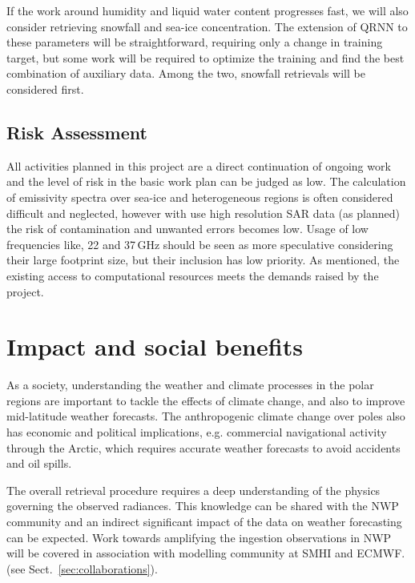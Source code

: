 \documentclass[12pt,oneside,a4paper]{article}
\begin{document}
If the work around humidity and liquid water content progresses fast, we will also consider retrieving snowfall and sea-ice concentration. The extension of QRNN to these parameters will be straightforward, requiring only a change in training target, but some work will be required to optimize the training and find the best combination of auxiliary data. Among the two, snowfall retrievals will be considered first. 
%
 
\subsection{Risk Assessment}
%
\label{sec:risk}
All activities planned in this project are a direct continuation of ongoing
work and the level of risk in the basic work plan can be judged as low. The
calculation of emissivity spectra over sea-ice and heterogeneous regions is
often considered difficult and neglected, however with use high resolution SAR
data (as planned) the risk of contamination and unwanted errors becomes low.
Usage of low frequencies like, 22 and 37\,GHz should be seen as more
speculative considering their large footprint size, but their inclusion has
low priority. As mentioned, the existing access to computational resources
meets the demands raised by the project.


\section{Impact and social benefits}
%
\label{sec:impact}

As a society, understanding the weather and climate processes in the polar regions are important to tackle the effects of climate change, and also to improve mid-latitude weather forecasts. The anthropogenic climate change over poles also has economic and political implications, e.g. commercial navigational activity through the Arctic, which
requires accurate weather forecasts to avoid accidents and oil spills.

The overall retrieval procedure requires a deep understanding of the physics
governing the observed radiances. This knowledge can be shared with the NWP community and an indirect significant impact of the data on weather forecasting can be expected. Work towards amplifying the ingestion observations in NWP will be covered in association with modelling community at SMHI and ECMWF. (see
Sect.~\ref{sec:collaborations}).


\end{document}
